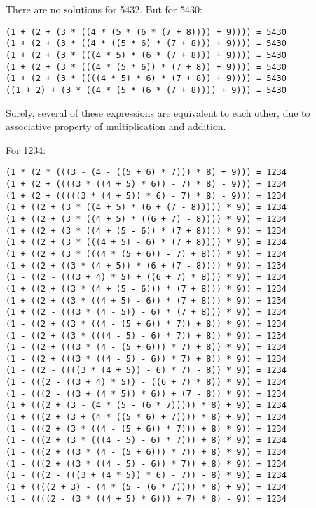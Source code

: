 There are no solutions for 5432. But for 5430:

\begin{lstlisting}
(1 + (2 + (3 * ((4 * (5 * (6 * (7 + 8)))) + 9)))) = 5430                                                  
(1 + (2 + (3 * ((4 * ((5 * 6) * (7 + 8))) + 9)))) = 5430
(1 + (2 + (3 * (((4 * 5) * (6 * (7 + 8))) + 9)))) = 5430
(1 + (2 + (3 * (((4 * (5 * 6)) * (7 + 8)) + 9)))) = 5430
(1 + (2 + (3 * ((((4 * 5) * 6) * (7 + 8)) + 9)))) = 5430
((1 + 2) + (3 * ((4 * (5 * (6 * (7 + 8)))) + 9))) = 5430
\end{lstlisting}

Surely, several of these expressions are equivalent to each other,
due to associative property of multiplication and addition.

For 1234:

\begin{lstlisting}
(1 * (2 * (((3 - (4 - ((5 + 6) * 7))) * 8) + 9))) = 1234                                                  
(1 + (2 + ((((3 * ((4 + 5) * 6)) - 7) * 8) - 9))) = 1234
(1 + (2 + (((((3 * (4 + 5)) * 6) - 7) * 8) - 9))) = 1234
(1 + ((2 + (3 * ((4 + 5) * (6 + (7 - 8))))) * 9)) = 1234
(1 + ((2 + (3 * ((4 + 5) * ((6 + 7) - 8)))) * 9)) = 1234
(1 + ((2 + (3 * ((4 + (5 - 6)) * (7 + 8)))) * 9)) = 1234
(1 + ((2 + (3 * (((4 + 5) - 6) * (7 + 8)))) * 9)) = 1234
(1 + ((2 + (3 * (((4 * (5 + 6)) - 7) + 8))) * 9)) = 1234
(1 + ((2 + ((3 * (4 + 5)) * (6 + (7 - 8)))) * 9)) = 1234
(1 - ((2 - (((3 + 4) * 5) + ((6 + 7) * 8))) * 9)) = 1234
(1 + ((2 + ((3 * (4 + (5 - 6))) * (7 + 8))) * 9)) = 1234
(1 + ((2 + ((3 * ((4 + 5) - 6)) * (7 + 8))) * 9)) = 1234
(1 + ((2 - (((3 * (4 - 5)) - 6) * (7 + 8))) * 9)) = 1234
(1 - ((2 + ((3 * ((4 - (5 + 6)) * 7)) + 8)) * 9)) = 1234
(1 - ((2 + ((3 * (((4 - 5) - 6) * 7)) + 8)) * 9)) = 1234
(1 - ((2 + (((3 * (4 - (5 + 6))) * 7) + 8)) * 9)) = 1234
(1 - ((2 + (((3 * ((4 - 5) - 6)) * 7) + 8)) * 9)) = 1234
(1 - ((2 - ((((3 * (4 + 5)) - 6) * 7) - 8)) * 9)) = 1234
(1 - (((2 - ((3 + 4) * 5)) - ((6 + 7) * 8)) * 9)) = 1234
(1 - (((2 - ((3 + (4 * 5)) * 6)) + (7 - 8)) * 9)) = 1234
(1 + (((2 + (3 - (4 * (5 - (6 * 7))))) * 8) + 9)) = 1234
(1 + (((2 + (3 + (4 * ((5 * 6) + 7)))) * 8) + 9)) = 1234
(1 - (((2 + (3 * ((4 - (5 + 6)) * 7))) + 8) * 9)) = 1234
(1 - (((2 + (3 * (((4 - 5) - 6) * 7))) + 8) * 9)) = 1234
(1 - (((2 + ((3 * (4 - (5 + 6))) * 7)) + 8) * 9)) = 1234
(1 - (((2 + ((3 * ((4 - 5) - 6)) * 7)) + 8) * 9)) = 1234
(1 - (((2 - (((3 + (4 * 5)) * 6) - 7)) - 8) * 9)) = 1234
(1 + ((((2 + 3) - (4 * (5 - (6 * 7)))) * 8) + 9)) = 1234
(1 - ((((2 - (3 * ((4 + 5) * 6))) + 7) * 8) - 9)) = 1234

\end{lstlisting}
